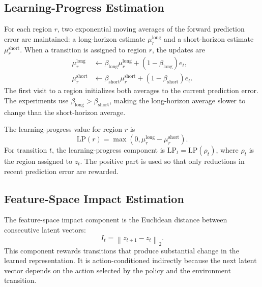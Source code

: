 \subsection{Learning-Progress Estimation}
\label{subsec:methodology_learning_progress_estimation}

For each region $r$, two exponential moving averages of the forward prediction error are maintained: a long-horizon estimate $\mu_r^{\mathrm{long}}$ and a short-horizon estimate $\mu_r^{\mathrm{short}}$.
When a transition is assigned to region $r$, the updates are
\begin{align}
    \mu_r^{\mathrm{long}}
    &\leftarrow
    \beta_{\mathrm{long}}\mu_r^{\mathrm{long}}
    +(1-\beta_{\mathrm{long}})e_t, \\
    \mu_r^{\mathrm{short}}
    &\leftarrow
    \beta_{\mathrm{short}}\mu_r^{\mathrm{short}}
    +(1-\beta_{\mathrm{short}})e_t.
\end{align}
The first visit to a region initializes both averages to the current prediction error.
The experiments use $\beta_{\mathrm{long}}>\beta_{\mathrm{short}}$, making the long-horizon average slower to change than the short-horizon average.

The learning-progress value for region $r$ is
\begin{equation}
    \mathrm{LP}(r)
    = \max\!\left(0,\mu_r^{\mathrm{long}}-\mu_r^{\mathrm{short}}\right).
\end{equation}
For transition $t$, the learning-progress component is $\mathrm{LP}_t=\mathrm{LP}(\rho_t)$, where $\rho_t$ is the region assigned to $z_t$.
The positive part is used so that only reductions in recent prediction error are rewarded.

\subsection{Feature-Space Impact Estimation}
\label{subsec:methodology_feature_space_impact_estimation}

The feature-space impact component is the Euclidean distance between consecutive latent vectors:
\begin{equation}
    I_t = \left\lVert z_{t+1}-z_t\right\rVert_2.
\end{equation}
This component rewards transitions that produce substantial change in the learned representation.
It is action-conditioned indirectly because the next latent vector depends on the action selected by the policy and the environment transition.

